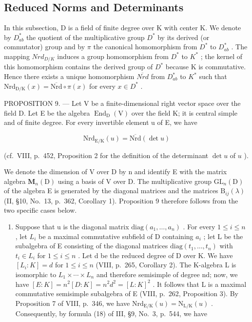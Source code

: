 \subsection{Reduced Norms and Determinants}

In this subsection, D is a field of finite degree over K with center K. We denote by \(D_{ab}^{*}\) the quotient of the multiplicative group \(D^{*}\) by its derived (or commutator) group and by \(\pi\) the canonical homomorphism from \(D^{*}\) to \(D_{ab}^{*}\) . The mapping \(Nrd_{D/K}\) induces a group homomorphism from \(D^{*}\) to \(K^{*}\) ; the kernel of this homomorphism contains the derived group of \(D^{*}\) because K is commutative. Hence there exists a unique homomorphism \(\overline{Nrd}\) from \(D_{ab}^{*}\) to \(K^{*}\) such that \(\mathrm{Nrd}_{\mathrm{D/K}}(x)=\overline{\mathrm{Nrd}}\circ\pi(x)\) for every \(x\in D^{*}\) .

PROPOSITION 9. --- Let V be a finite-dimensional right vector space over the field D. Let E be the algebra \(\operatorname{End}_{\mathrm{D}}(\mathrm{V})\) over the field K; it is central simple and of finite degree. For every invertible element u of E, we have

\[
\mathrm{Nrd} _ {\mathrm{E/K}} (u) = \overline {{\mathrm{Nrd}}} (\det u)\tag{64}
\]

(cf.~VIII, p.~452, Proposition 2 for the definition of the determinant \(\det u\) of \(u\) ).

We denote the dimension of V over D by n and identify E with the matrix algebra \(\mathbf{M}_{n}(\mathrm{D})\) using a basis of V over D. The multiplicative group \(\mathrm{GL}_{n}(\mathrm{D})\) of the algebra E is generated by the diagonal matrices and the matrices \(\mathrm{B}_{ij}(\lambda)\) (II, §10, No.~13, p.~362, Corollary 1). Proposition 9 therefore follows from the two specific cases below.

\begin{enumerate}
\def\labelenumi{\Alph{enumi})}
\tightlist
\item
  Suppose that u is the diagonal matrix \(\mathrm{diag}(a_{1},\ldots,a_{n})\) . For every \(1\leqslant i\leqslant n\) , let \(L_{i}\) be a maximal commutative subfield of D containing \(a_{i}\) ; let L be the subalgebra of E consisting of the diagonal matrices \(\mathrm{diag}(t_{1},\ldots,t_{n})\) with \(t_{i}\in L_{i}\) for \(1\leqslant i\leqslant n\) . Let d be the reduced degree of D over K. We have \([L_{i}:K]=d\) for \(1\leqslant i\leqslant n\) (VIII, p.~265, Corollary 2). The K-algebra L is isomorphic to \(L_{1}\times\cdots\times L_{n}\) and therefore semisimple of degree nd; now, we have \([E:K]=n^{2}[D:K]=n^{2}d^{2}=[L:K]^{2}\) . It follows that L is a maximal commutative semisimple subalgebra of E (VIII, p.~262, Proposition 3). By Proposition 7 of VIII, p.~346, we have \(\mathrm{Nrd}_{\mathrm{E}/\mathrm{K}}(u)=\mathrm{N}_{\mathrm{L}/\mathrm{K}}(u)\) . Consequently, by formula (18) of III, §9, No.~3, p.~544, we have
\end{enumerate}


